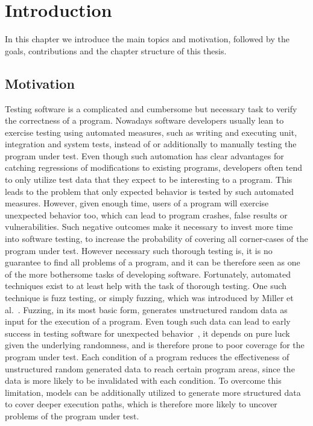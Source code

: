 \chapter{Introduction}
\label{chapter:introduction}

In this chapter we introduce the main topics and motivation, followed by the goals, contributions and the chapter structure of this thesis.

\section{Motivation}
\label{sec:motivation}

Testing software is a complicated and cumbersome but necessary task to verify the correctness of a program. Nowadays software developers usually lean to exercise testing using automated measures, such as writing and executing unit, integration and system tests, instead of or additionally to manually testing the program under test. Even though such automation has clear advantages for catching regressions of modifications to existing programs, developers often tend to only utilize test data that they expect to be interesting to a program. This leads to the problem that only expected behavior is tested by such automated measures. However, given enough time, users of a program will exercise unexpected behavior too, which can lead to program crashes, false results or vulnerabilities. Such negative outcomes make it necessary to invest more time into software testing, to increase the probability of covering all corner-cases of the program under test. However necessary such thorough testing is, it is no guarantee to find all problems of a program, and it can be therefore seen as one of the more bothersome tasks of developing software. Fortunately, automated techniques exist to at least help with the task of thorough testing. One such technique is fuzz testing, or simply fuzzing, which was introduced by Miller et al.~\cite{miller1995fuzz}. Fuzzing, in its most basic form, generates unstructured random data as input for the execution of a program. Even tough such data can lead to early success in testing software for unexpected behavior~\cite{miller1995fuzz}, it depends on pure luck given the underlying randomness, and is therefore prone to poor coverage for the program under test. Each condition of a program reduces the effectiveness of unstructured random generated data to reach certain program areas, since the data is more likely to be invalidated with each condition. To overcome this limitation, models can be additionally utilized to generate more structured data to cover deeper execution paths, which is therefore more likely to uncover problems of the program under test.

